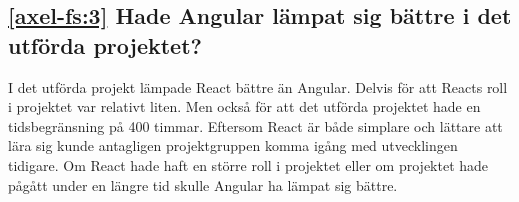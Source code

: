 \subsection*{\ref{axel-fs:3} Hade Angular lämpat sig bättre i det utförda projektet?}
I det utförda projekt lämpade React bättre än Angular. Delvis för att Reacts roll i projektet var relativt liten. Men också för att det utförda projektet hade en tidsbegränsning på 400 timmar. Eftersom React är både simplare och lättare att lära sig kunde antagligen projektgruppen komma igång med utvecklingen tidigare. Om React hade haft en större roll i projektet eller om projektet hade pågått under en längre tid skulle Angular ha lämpat sig bättre.


